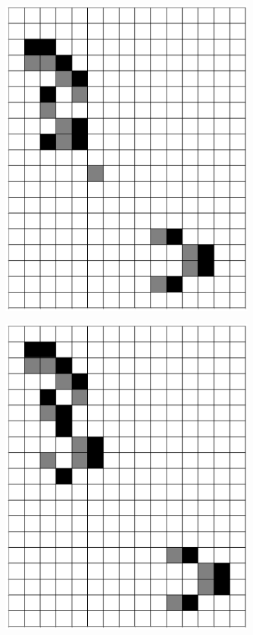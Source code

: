 \documentclass[12pt]{article}
\numberwithin{figure}{section} %
\begin{document}
\begin{figure}[H]
\begin{subfigure}{0.3\textwidth}
     \includegraphics[width=\linewidth]{Section4/29.7}
     \subcaption{}
   \end{subfigure}
        \begin{subfigure}{0.3\textwidth}
     \centering
     \includegraphics[width=\linewidth]{Section4/29.8}

\end{subfigure}
\end{figure}
\end{document}

